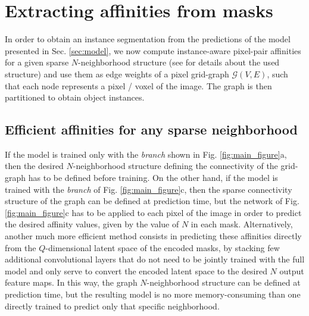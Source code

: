 \section{Extracting affinities from \maskname masks}
In order to obtain an instance segmentation from the predictions of the model presented in Sec. \ref{sec:model}, we now compute instance-aware pixel-pair affinities for a given sparse $N$-neighborhood structure (see  for details about the used structure) and use them as edge weights of a pixel grid-graph $\mathcal{G}(V,E)$, such that each node represents a pixel / voxel of the image. The graph is then partitioned to obtain object instances.



\subsection{Efficient affinities for any sparse neighborhood}\label{sec:efficient_affs}
If the model is trained only with the \emph{\sparseBr branch} shown in Fig. \ref{fig:main_figure}a, then the desired $N$-neighborhood structure defining the connectivity of the grid-graph has to be defined before training. 
On the other hand, if the model is trained with the \emph{\encBr branch} of Fig. \ref{fig:main_figure}c, then the sparse connectivity structure of the graph can be defined at prediction time, but the \emph{\maskDec} network of Fig. \ref{fig:main_figure}c has to be applied to each pixel of the image in order to predict the desired affinity values, given by the value of $N$ in each mask. 
Alternatively, another much more efficient method consists in predicting these affinities directly from the $Q$-dimensional latent space of the encoded masks, by stacking few additional convolutional layers that do not need to be jointly trained with the full model and only serve to convert the encoded latent space to the desired $N$ output feature maps.
In this way, the graph $N$-neighborhood structure can be defined at prediction time, but the resulting model is no more memory-consuming than one directly trained to predict only that specific neighborhood. 



